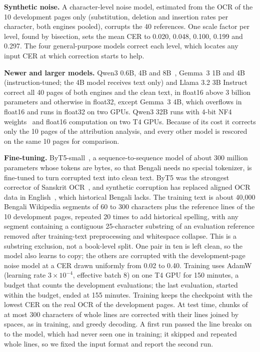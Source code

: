 \documentclass[conference]{IEEEtran}
\begin{document}
\textbf{Synthetic noise.} A character-level noise model, estimated from the OCR of the 10 development pages only (substitution, deletion and insertion rates per character, both engines pooled), corrupts the 40 references. One scale factor per level, found by bisection, sets the mean CER to 0.020, 0.048, 0.100, 0.199 and 0.297. The four general-purpose models correct each level, which locates any input CER at which correction starts to help.

\textbf{Newer and larger models.} Qwen3 0.6B, 4B and 8B~\cite{qwen2025card}, Gemma~3 1B and 4B~\cite{gemma3card2025} (instruction-tuned; the 4B model receives text only) and Llama 3.2 3B Instruct~\cite{meta2024llama32} correct all 40 pages of both engines and the clean text, in float16 above 3 billion parameters and otherwise in float32, except Gemma~3 4B, which overflows in float16 and runs in float32 on two GPUs. Qwen3 32B runs with 4-bit NF4 weights~\cite{dettmers2023qlora} and float16 computation on two T4 GPUs. Because of its cost it corrects only the 10 pages of the attribution analysis, and every other model is rescored on the same 10 pages for comparison.

\textbf{Fine-tuning.} ByT5-small~\cite{xue2022byt5}, a sequence-to-sequence model of about 300 million parameters whose tokens are bytes, so that Bengali needs no special tokenizer, is fine-tuned to turn corrupted text into clean text. ByT5 was the strongest corrector of Sanskrit OCR~\cite{maheshwari2022sanskrit}, and synthetic corruption has replaced aligned OCR data in English~\cite{bourne2025scrambled}, which historical Bengali lacks. The training text is about 40{,}000 Bengali Wikipedia segments of 60 to 300 characters plus the reference lines of the 10 development pages, repeated 20 times to add historical spelling, with any segment containing a contiguous 25-character substring of an evaluation reference removed after training-text preprocessing and whitespace collapse. This is a substring exclusion, not a book-level split. One pair in ten is left clean, so the model also learns to copy; the others are corrupted with the development-page noise model at a CER drawn uniformly from 0.02 to 0.40. Training uses AdamW (learning rate $3\times10^{-4}$, effective batch 8) on one T4 GPU for 150 minutes, a budget that counts the development evaluations; the last evaluation, started within the budget, ended at 155 minutes. Training keeps the checkpoint with the lowest CER on the real OCR of the development pages. At test time, chunks of at most 300 characters of whole lines are corrected with their lines joined by spaces, as in training, and greedy decoding. A first run passed the line breaks on to the model, which had never seen one in training; it skipped and repeated whole lines, so we fixed the input format and report the second run.
\end{document}
